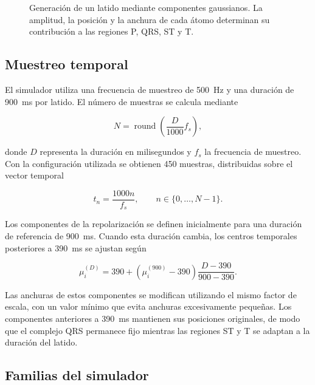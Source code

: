 \begin{figure}[H]
  \centering
  \caption{Generación de un latido mediante componentes gaussianos. La amplitud, la posición y la anchura de cada átomo determinan su contribución a las regiones P, QRS, ST y T.}
  \label{fig:gaussian_generator}
\end{figure}

\subsection{Muestreo temporal}

El simulador utiliza una frecuencia de muestreo de 500~Hz y una duración de 900~ms por latido. El número de muestras se calcula mediante

\begin{equation}
N =
\operatorname{round}
\left(
\frac{D}{1000}f_s
\right),
\end{equation}

donde \(D\) representa la duración en milisegundos y \(f_s\) la frecuencia de muestreo. Con la configuración utilizada se obtienen 450 muestras, distribuidas sobre el vector temporal

\begin{equation}
t_n =
\frac{1000n}{f_s},
\qquad
n \in \{0,\ldots,N-1\}.
\end{equation}

Los componentes de la repolarización se definen inicialmente para una duración de referencia de 900~ms. Cuando esta duración cambia, los centros temporales posteriores a 390~ms se ajustan según

\begin{equation}
\mu_i^{(D)} =
390 +
\left(
\mu_i^{(900)}-390
\right)
\frac{D-390}{900-390}.
\label{eq:time_scaling}
\end{equation}

Las anchuras de estos componentes se modifican utilizando el mismo factor de escala, con un valor mínimo que evita anchuras excesivamente pequeñas. Los componentes anteriores a 390~ms mantienen sus posiciones originales, de modo que el complejo QRS permanece fijo mientras las regiones ST y T se adaptan a la duración del latido.

\subsection{Familias del simulador}

